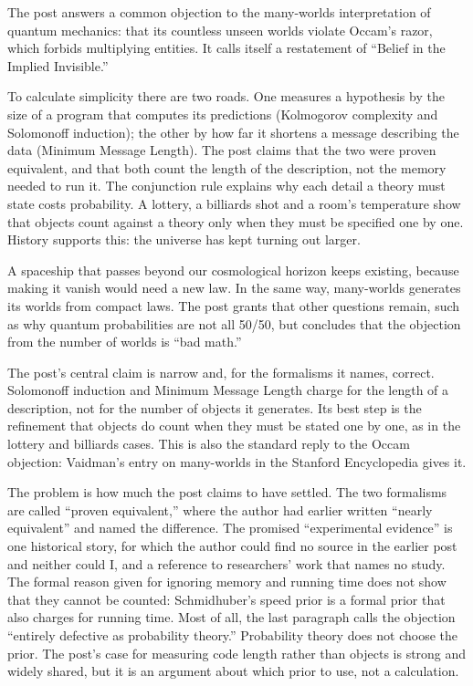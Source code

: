 \begin{afterword}
\summaryhead

The post answers a common objection to the many-worlds interpretation of quantum mechanics: that its countless unseen worlds violate Occam's razor, which forbids multiplying entities. It calls itself a restatement of ``Belief in the Implied Invisible.''

To calculate simplicity there are two roads. One measures a hypothesis by the size of a program that computes its predictions (Kolmogorov complexity and Solomonoff induction); the other by how far it shortens a message describing the data (Minimum Message Length). The post claims that the two were proven equivalent, and that both count the length of the description, not the memory needed to run it. The conjunction rule explains why each detail a theory must state costs probability. A lottery, a billiards shot and a room's temperature show that objects count against a theory only when they must be specified one by one. History supports this: the universe has kept turning out larger.

A spaceship that passes beyond our cosmological horizon keeps existing, because making it vanish would need a new law. In the same way, many-worlds generates its worlds from compact laws. The post grants that other questions remain, such as why quantum probabilities are not all 50/50, but concludes that the objection from the number of worlds is ``bad math.''

\responsehead

The post's central claim is narrow and, for the formalisms it names, correct. Solomonoff induction and Minimum Message Length charge for the length of a description, not for the number of objects it generates. Its best step is the refinement that objects do count when they must be stated one by one, as in the lottery and billiards cases. This is also the standard reply to the Occam objection: Vaidman's entry on many-worlds in the Stanford Encyclopedia gives it.

The problem is how much the post claims to have settled. The two formalisms are called ``proven equivalent,'' where the author had earlier written ``nearly equivalent'' and named the difference. The promised ``experimental evidence'' is one historical story, for which the author could find no source in the earlier post and neither could I, and a reference to researchers' work that names no study. The formal reason given for ignoring memory and running time does not show that they cannot be counted: Schmidhuber's speed prior is a formal prior that also charges for running time. Most of all, the last paragraph calls the objection ``entirely defective as probability theory.'' Probability theory does not choose the prior. The post's case for measuring code length rather than objects is strong and widely shared, but it is an argument about which prior to use, not a calculation.


\end{afterword}
